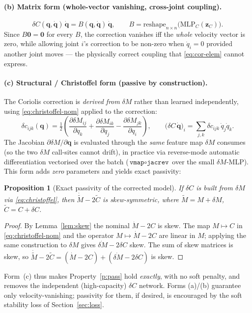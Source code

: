 \documentclass[11pt]{article}
\newcommand{\q}{\bm{q}}
\newcommand{\qd}{\dot{\bm{q}}}
\newcommand{\dM}{\delta\!M}
\newcommand{\dC}{\delta C}
\newcommand{\MLP}{\mathrm{MLP}}
\newcommand{\Mmat}{M}
\newcommand{\Cmat}{C}
\newcommand{\Mt}{\tilde{M}}
\newcommand{\Ct}{\tilde{C}}
\newcommand{\half}{\tfrac{1}{2}}
\theoremstyle{definition}
\theoremstyle{plain}
\newtheorem{proposition}{Proposition}
\begin{document}
\paragraph{(b) Matrix form (whole-vector vanishing, cross-joint coupling).}
\begin{equation}
\dC(\q,\qd)\,\qd=B(\q,\qd)\,\qd,
\qquad B=\mathrm{reshape}_{n\times n}\!\big(\MLP_C(\bm z_C)\big).
\label{eq:cor-mat}
\end{equation}
Since $B\bm 0=\bm 0$ for every $B$, the correction vanishes iff the \emph{whole}
velocity vector is zero, while allowing joint $i$'s correction to be non-zero when
$\dot q_i=0$ provided another joint moves --- the physically correct coupling that
\eqref{eq:cor-elem} cannot express.

\paragraph{(c) Structural / Christoffel form (passive by construction).}
The Coriolis correction is \emph{derived from} $\dM$ rather than learned
independently, using \eqref{eq:christoffel-nom} applied to the correction:
\begin{equation}
\delta c_{ijk}(\q)=\half\!\left(\frac{\partial\dM_{ij}}{\partial q_k}+\frac{\partial\dM_{ik}}{\partial q_j}-\frac{\partial\dM_{jk}}{\partial q_i}\right),
\qquad
\big(\dC\,\qd\big)_i=\sum_{j,k}\delta c_{ijk}\,\dot q_j\dot q_k .
\label{eq:christoffel}
\end{equation}
The Jacobian $\partial\dM/\partial\q$ is evaluated through the \emph{same} feature
map $\dM$ consumes (so the two $\dM$ call-sites cannot drift), in practice via
reverse-mode automatic differentiation vectorised over the batch
($\texttt{vmap}\circ\texttt{jacrev}$ over the small $\dM$-MLP). This form adds
\emph{zero} parameters and yields exact passivity:
\begin{proposition}[Exact passivity of the corrected model]\label{prop:passive}
If $\dC$ is built from $\dM$ via \eqref{eq:christoffel}, then
$\dot{\Mt}-2\Ct$ is skew-symmetric, where $\Mt=\Mmat+\dM$, $\Ct=\Cmat+\dC$.
\end{proposition}
\begin{proof}
By Lemma~\ref{lem:skew} the nominal $\dot{\Mmat}-2\Cmat$ is skew. The map
$\Mmat\mapsto\Cmat$ in \eqref{eq:christoffel-nom} and the operator
$\Mmat\mapsto\dot{\Mmat}-2\Cmat$ are linear in $\Mmat$; applying the same
construction to $\dM$ gives $\dot{\dM}-2\dC$ skew. The sum of skew matrices is
skew, so $\dot{\Mt}-2\Ct=(\dot{\Mmat}-2\Cmat)+(\dot{\dM}-2\dC)$ is skew.
\end{proof}
Form~(c) thus makes Property~\ref{p:pass} hold \emph{exactly}, with no soft
penalty, and removes the independent (high-capacity) $\dC$ network. Forms (a)/(b)
guarantee only velocity-vanishing; passivity for them, if desired, is encouraged
by the soft stability loss of Section~\ref{sec:loss}.
\end{document}
